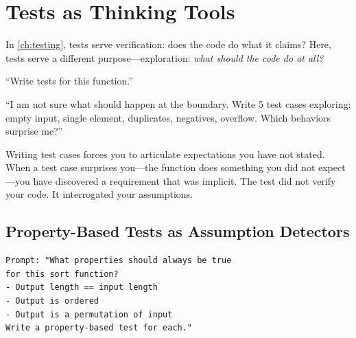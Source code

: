 \section{Tests as Thinking Tools}
\label{sec:tests-as-thinking}

In \cref{ch:testing}, tests serve verification: does the code do what it claims?
Here, tests serve a different purpose---exploration:
\emph{what should the code do at all?}

\begin{beforeafter}
\before
``Write tests for this function.''

\after
``I am not sure what should happen at the boundary.
Write 5 test cases exploring: empty input, single element,
duplicates, negatives, overflow.
Which behaviors surprise me?''
\end{beforeafter}

\begin{whybox}
Writing test cases forces you to articulate expectations you have not
stated. When a test case surprises you---the function does something
you did not expect---you have discovered a requirement that was implicit.
The test did not verify your code. It interrogated your assumptions.
\end{whybox}


\subsection{Property-Based Tests as Assumption Detectors}


\begin{verbatim}
Prompt: "What properties should always be true
for this sort function?
- Output length == input length
- Output is ordered
- Output is a permutation of input
Write a property-based test for each."
\end{verbatim}

